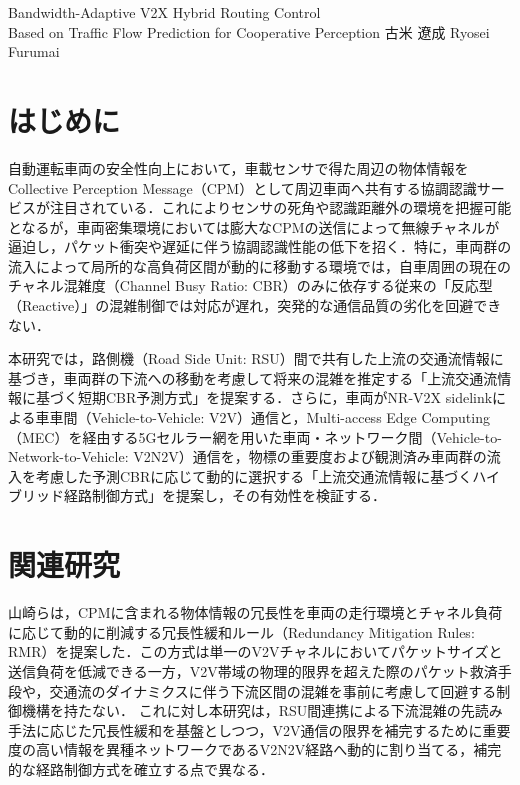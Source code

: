 \documentclass[a4paper,10pt,twocolumn,uplatex]{jsarticle}
\date{11}
\begin{document}
{Bandwidth-Adaptive V2X Hybrid Routing Control
\\Based on Traffic Flow Prediction for Cooperative Perception}
{古米 遼成}
{Ryosei Furumai}


\section{はじめに}
自動運転車両の安全性向上において，車載センサで得た周辺の物体情報をCollective Perception Message（CPM）として周辺車両へ共有する協調認識サービスが注目されている．これによりセンサの死角や認識距離外の環境を把握可能となるが，車両密集環境においては膨大なCPMの送信によって無線チャネルが逼迫し，パケット衝突や遅延に伴う協調認識性能の低下を招く．特に，車両群の流入によって局所的な高負荷区間が動的に移動する環境では，自車周囲の現在のチャネル混雑度（Channel Busy Ratio: CBR）のみに依存する従来の「反応型（Reactive）」の混雑制御では対応が遅れ，突発的な通信品質の劣化を回避できない．

本研究では，路側機（Road Side Unit: RSU）間で共有した上流の交通流情報に基づき，車両群の下流への移動を考慮して将来の混雑を推定する「上流交通流情報に基づく短期CBR予測方式」を提案する．さらに，車両がNR-V2X sidelinkによる車車間（Vehicle-to-Vehicle: V2V）通信と，Multi-access Edge Computing（MEC）を経由する5Gセルラー網を用いた車両・ネットワーク間（Vehicle-to-Network-to-Vehicle: V2N2V）通信を，物標の重要度および観測済み車両群の流入を考慮した予測CBRに応じて動的に選択する「上流交通流情報に基づくハイブリッド経路制御方式」を提案し，その有効性を検証する．

\section{関連研究}
山崎らは，CPMに含まれる物体情報の冗長性を車両の走行環境とチャネル負荷に応じて動的に削減する冗長性緩和ルール（Redundancy Mitigation Rules: RMR）を提案した\cite{yamasaki2023}．この方式は単一のV2Vチャネルにおいてパケットサイズと送信負荷を低減できる一方，V2V帯域の物理的限界を超えた際のパケット救済手段や，交通流のダイナミクスに伴う下流区間の混雑を事前に考慮して回避する制御機構を持たない．
これに対し本研究は，RSU間連携による下流混雑の先読み手法に応じた冗長性緩和を基盤としつつ，V2V通信の限界を補完するために重要度の高い情報を異種ネットワークであるV2N2V経路へ動的に割り当てる，補完的な経路制御方式を確立する点で異なる．
\end{document}
